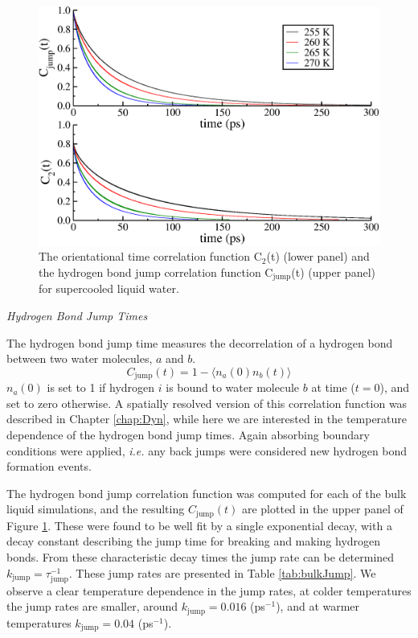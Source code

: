 \begin{figure}
\includegraphics[width=\linewidth]{Figures/jump_lcorr}
\caption{\label{fig:jump_lcorr} The orientational time correlation
  function C$_2$(t) (lower panel) and the hydrogen bond jump
  correlation function C$_\mathrm{jump}$(t) (upper panel) for
  supercooled liquid water. }
\end{figure}                

\vspace{0.6cm}
\begin{flushleft}
\textit{Hydrogen Bond Jump Times}
\end{flushleft}
The hydrogen bond jump time measures the decorrelation of a hydrogen
bond between two water molecules, $a$ and $b$. 
\begin{equation}\label{jump}
C_\mathrm{jump}(t) = 1 - \langle n_a(0) n_b(t) \rangle
\end{equation}
$n_a(0)$ is set to 1 if hydrogen $i$ is bound to water molecule $b$ at
time ($t=0$), and set to zero otherwise. A spatially resolved version
of this correlation function was described in Chapter \ref{chap:Dyn},
while here we are interested in the temperature dependence of the
hydrogen bond jump times. Again absorbing boundary conditions were
applied, \textit{i.e.} any back jumps were considered new hydrogen
bond formation events.

The hydrogen bond jump correlation function was computed for each of
the bulk liquid simulations, and the resulting $C_\mathrm{jump}(t)$
are plotted in the upper panel of Figure \ref{fig:jump_lcorr}. These
were found to be well fit by a single exponential decay, with a decay
constant describing the jump time for breaking and making hydrogen
bonds. From these characteristic decay times the jump rate can be
determined $k_\mathrm{jump} = \tau_\mathrm{jump}^{-1}$. These jump
rates are presented in Table \ref{tab:bulkJump}. We observe a clear
temperature dependence in the jump rates, at colder temperatures the
jump rates are smaller, around $k_\mathrm{jump} = 0.016$ (ps$^{-1}$),
and at warmer temperatures $k_\mathrm{jump} = 0.04$ (ps$^{-1}$).

